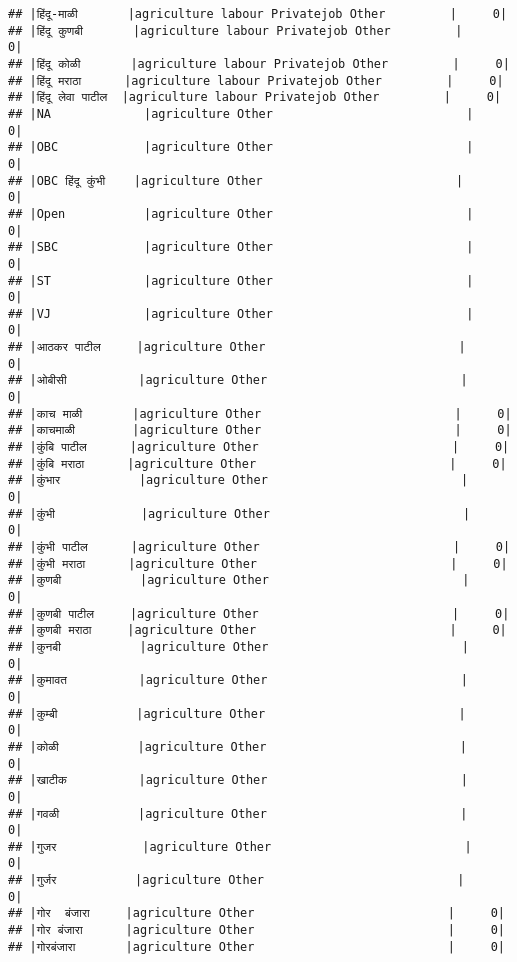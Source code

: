 \documentclass[
]{article}
\begin{document}
\begin{verbatim}
## |हिंदू-माळी       |agriculture labour Privatejob Other         |     0|
## |हिंदू कुणबी       |agriculture labour Privatejob Other         |     0|
## |हिंदू कोळी       |agriculture labour Privatejob Other         |     0|
## |हिंदू मराठा      |agriculture labour Privatejob Other         |     0|
## |हिंदू लेवा पाटील  |agriculture labour Privatejob Other         |     0|
## |NA             |agriculture Other                           |     0|
## |OBC            |agriculture Other                           |     0|
## |OBC हिंदू कुंभी    |agriculture Other                           |     0|
## |Open           |agriculture Other                           |     0|
## |SBC            |agriculture Other                           |     0|
## |ST             |agriculture Other                           |     0|
## |VJ             |agriculture Other                           |     0|
## |आठकर पाटील     |agriculture Other                           |     0|
## |ओबीसी          |agriculture Other                           |     0|
## |काच माळी       |agriculture Other                           |     0|
## |काचमाळी        |agriculture Other                           |     0|
## |कुंबि पाटील      |agriculture Other                           |     0|
## |कुंबि मराठा      |agriculture Other                           |     0|
## |कुंभार           |agriculture Other                           |     0|
## |कुंभी            |agriculture Other                           |     0|
## |कुंभी पाटील      |agriculture Other                           |     0|
## |कुंभी मराठा      |agriculture Other                           |     0|
## |कुणबी           |agriculture Other                           |     0|
## |कुणबी पाटील     |agriculture Other                           |     0|
## |कुणबी मराठा     |agriculture Other                           |     0|
## |कुनबी           |agriculture Other                           |     0|
## |कुमावत          |agriculture Other                           |     0|
## |कुम्बी           |agriculture Other                           |     0|
## |कोळी           |agriculture Other                           |     0|
## |खाटीक          |agriculture Other                           |     0|
## |गवळी           |agriculture Other                           |     0|
## |गुजर            |agriculture Other                           |     0|
## |गुर्जर           |agriculture Other                           |     0|
## |गोर  बंजारा     |agriculture Other                           |     0|
## |गोर बंजारा      |agriculture Other                           |     0|
## |गोरबंजारा       |agriculture Other                           |     0|

\end{verbatim}
\end{document}
